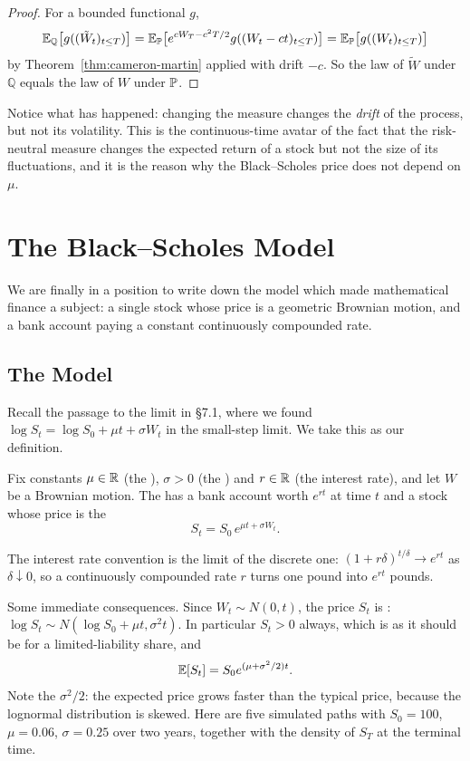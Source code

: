 \documentclass[a4paper]{scrartcl}
\newcommand{\QQ}{\mathbb{Q}}
\begin{document}
\begin{proof}
	For a bounded functional $g$,
	$$
	\EE_\QQ\big[g((\tilde W_t)_{t\leq T})\big] = \EE_\PP\big[e^{cW_T-c^2T/2}g((W_t - ct)_{t\leq T})\big] = \EE_\PP\big[g((W_t)_{t\leq T})\big]
	$$
	by Theorem~\ref{thm:cameron-martin} applied with drift $-c$. So the law of $\tilde W$ under $\QQ$ equals the law of $W$ under $\mathbb{P}$.
\end{proof}

Notice what has happened: changing the measure changes the \emph{drift} of the process, but not its volatility. This is the continuous-time avatar of the fact that the risk-neutral measure changes the expected return of a stock but not the size of its fluctuations, and it is the reason why the Black--Scholes price does not depend on $\mu$.

\section{The Black--Scholes Model}

We are finally in a position to write down the model which made mathematical finance a subject: a single stock whose price is a geometric Brownian motion, and a bank account paying a constant continuously compounded rate.

\subsection{The Model}

Recall the passage to the limit in \S7.1, where we found $\log S_t = \log S_0 + \mu t + \sigma W_t$ in the small-step limit. We take this as our definition.

\begin{definition}
	Fix constants $\mu \in \mathbb{R}$ (the ), $\sigma>0$ (the ) and $r \in \mathbb{R}$ (the interest rate), and let $W$ be a Brownian motion. The  has a bank account worth $e^{rt}$ at time $t$ and a stock whose price is the 
	$$
	S_t = S_0\,e^{\mu t + \sigma W_t}.
	$$
\end{definition}

The interest rate convention is the limit of the discrete one: $(1+r\delta)^{t/\delta}\to e^{rt}$ as $\delta \downarrow 0$, so a continuously compounded rate $r$ turns one pound into $e^{rt}$ pounds.

Some immediate consequences. Since $W_t\sim N(0,t)$, the price $S_t$ is : $\log S_t \sim N(\log S_0 + \mu t, \sigma^2 t)$. In particular $S_t>0$ always, which is as it should be for a limited-liability share, and
$$
\mathbb{E}[S_t] = S_0e^{(\mu+\sigma^2/2)t}.
$$
Note the $\sigma^2/2$: the expected price grows faster than the typical price, because the lognormal distribution is skewed. Here are five simulated paths with $S_0 = 100$, $\mu = 0.06$, $\sigma = 0.25$ over two years, together with the density of $S_T$ at the terminal time.
\end{document}
